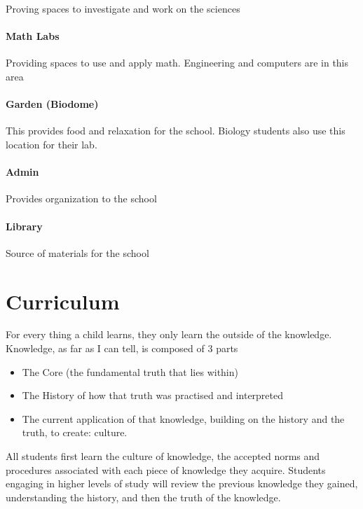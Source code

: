 \documentclass[CSHFoundation.tex]{subfiles}
\begin{document}
Proving spaces to investigate and work on the sciences

\paragraph{Math Labs}

Providing spaces to use and apply math. Engineering and computers are in this area

\paragraph{Garden (Biodome)}

This provides food and relaxation for the school. Biology students also use this location for their lab.

\paragraph{Admin}

Provides organization to the school

\paragraph{Library}

Source of materials for the school

\section{Curriculum}

For every thing a child learns, they only learn the outside of the knowledge. Knowledge, as far as I can tell, is composed of 3 parts

\begin{itemize}
\item The Core (the fundamental truth that lies within)
\item The History of how that truth was practised and interpreted
\item The current application of that knowledge, building on the history and the truth, to create: culture.
\end{itemize}

All students first learn the culture of knowledge, the accepted norms and procedures associated with each piece of knowledge they acquire. Students engaging in higher levels of study will review the previous knowledge they gained, understanding the history, and then the truth of the knowledge.
\end{document}
